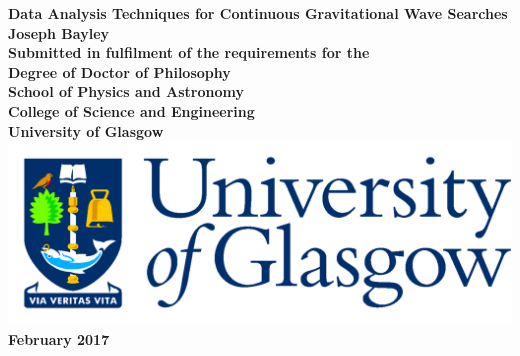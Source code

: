 \documentclass[12pt,titlepage,oneside]{book}
\begin{document}
\begin{titlepage}
\centering
\vspace*{3cm}  %
\bfseries\Large
Data Analysis Techniques for Continuous Gravitational Wave Searches\\
\vspace{3cm}
\normalfont\large
Joseph Bayley\\
\vspace{2cm}
Submitted in fulfilment of the requirements for the\\
Degree of Doctor of Philosophy\\
\vspace{2cm}
School of Physics and Astronomy\\
College of Science and Engineering\\
University of Glasgow\\
\vspace{1cm}
\includegraphics[scale=0.125]{GlaLogo.pdf}
\\
\vspace{1cm}
February 2017
\end{titlepage}
\frontmatter  %

\glsunsetall
\tableofcontents
\listoftables
\listoffigures
\glsresetall



\printglossaries
	


\mainmatter %














\appendix



%
%

\printbibliography 
\end{document}
